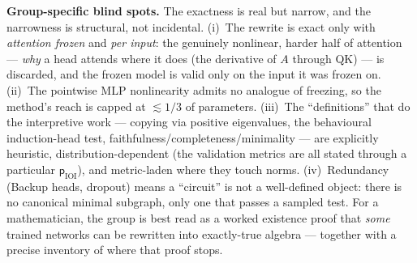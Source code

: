 \textbf{Group-specific blind spots.} The exactness is real but narrow, and the narrowness is structural, not incidental. (i)~The rewrite is exact only with \emph{attention frozen} and \emph{per input}: the genuinely nonlinear, harder half of attention --- \emph{why} a head attends where it does (the derivative of $A$ through QK) --- is discarded, and the frozen model is valid only on the input it was frozen on. (ii)~The pointwise MLP nonlinearity admits no analogue of freezing, so the method's reach is capped at $\lesssim 1/3$ of parameters. (iii)~The ``definitions'' that do the interpretive work --- copying via positive eigenvalues, the behavioural induction-head test, faithfulness/completeness/minimality --- are explicitly heuristic, distribution-dependent (the validation metrics are all stated through a particular $\mathsf{p}_{\mathrm{IOI}}$), and metric-laden where they touch norms. (iv)~Redundancy (Backup heads, dropout) means a ``circuit'' is not a well-defined object: there is no canonical minimal subgraph, only one that passes a sampled test. For a mathematician, the group is best read as a worked existence proof that \emph{some} trained networks can be rewritten into exactly-true algebra --- together with a precise inventory of where that proof stops.


\printbibliography

